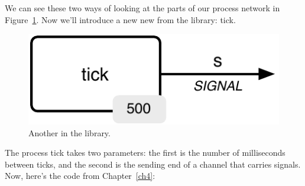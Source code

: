 \begin{figure}
\begin{center}
\hspace{1cm}
\caption{}
\label{diagram:button-and-pin} %
\end{center}
\end{figure}

We can see these two ways of looking at the parts of our process network in Figure~\ref{diagram:button-and-pin}. Now we'll introduce a new new \PROCedure from the \plumbing library: {\code tick}.

\begin{figure}[!h]
  \begin{center}
    \includegraphics[width=0.6\linewidth]{images/ch5-tick}
    \caption{Another \PROCedure in the \plumbing library.}
  \end{center}
\end{figure}

\newpage

The process {\code tick} takes two parameters: the first is the number of milliseconds between ticks, and the second is the sending end of a channel that carries signals. Now, here's the code from Chapter~\ref{ch4}:

\vspace{3mm}


